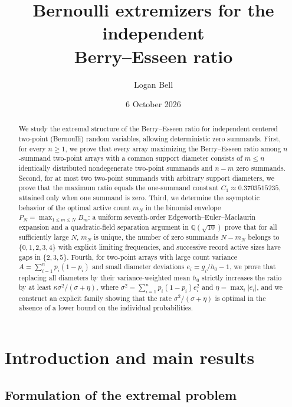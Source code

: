 \documentclass[11pt]{article}
\title{Bernoulli extremizers for the independent\\Berry--Esseen ratio}
\author{Logan Bell}
\date{6 October 2026}
\numberwithin{equation}{section}
\theoremstyle{remark}
\begin{document}
\maketitle
\begin{abstract}
We study the extremal structure of the Berry--Esseen ratio for independent
centered two-point (Bernoulli) random variables, allowing deterministic zero
summands. First, for every $n\ge1$, we prove that every array maximizing the
Berry--Esseen ratio among $n$-summand two-point arrays with a common support
diameter consists of $m\le n$ identically distributed nondegenerate two-point
summands and $n-m$ zero summands. Second, for at most two two-point summands
with arbitrary support diameters, we prove that the maximum ratio equals the
one-summand constant $C_1\approx0.3703515235$, attained only when one summand
is zero. Third, we determine the asymptotic behavior of the optimal active
count $m_N$ in the binomial envelope $P_N=\max_{1\le m\le N}B_m$: a uniform
seventh-order Edgeworth--Euler--Maclaurin expansion and a quadratic-field
separation argument in $\mathbb Q(\sqrt{10})$ prove that for all sufficiently
large $N$, $m_N$ is unique, the number of zero summands $N-m_N$ belongs to
$\{0,1,2,3,4\}$ with explicit limiting frequencies, and successive record
active sizes have gaps in $\{2,3,5\}$. Fourth, for two-point arrays with
large count variance $A=\sum_{i=1}^np_i(1-p_i)$ and small diameter deviations
$e_i=g_i/h_0-1$, we prove that replacing all diameters by their
variance-weighted mean $h_0$ strictly increases the ratio by at least
$\kappa\sigma^2/(\sigma+\eta)$, where $\sigma^2=\sum_{i=1}^np_i(1-p_i)e_i^2$
and $\eta=\max_i|e_i|$, and we construct an explicit family showing that the
rate $\sigma^2/(\sigma+\eta)$ is optimal in the absence of a lower bound on
the individual probabilities.
\end{abstract}
\tableofcontents

\section{Introduction and main results}

\subsection{Formulation of the extremal problem}
\end{document}
